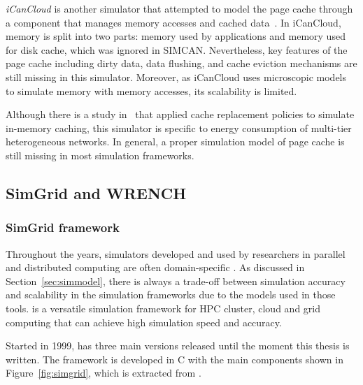 \textit{iCanCloud} is another simulator that attempted to model the page cache 
through a component that manages memory accesses and cached 
data~\cite{nunez2012icancloud}. 
In iCanCloud, memory is split into two parts: memory used by applications 
and memory used for disk cache, which was ignored in SIMCAN. 
Nevertheless, key features of the page cache including dirty data, 
data flushing, and cache eviction mechanisms are still missing 
in this simulator.
Moreover, as iCanCloud uses microscopic models to simulate memory 
with memory accesses, its scalability is limited. 

Although there is a study in~\cite{xu2018saving} that applied cache 
replacement policies to simulate in-memory caching, this simulator 
is specific to energy consumption of multi-tier heterogeneous networks.
In general, a proper simulation model of page cache is still missing 
in most simulation frameworks.

\subsection{SimGrid and WRENCH}

\subsubsection{SimGrid framework}

Throughout the years, simulators developed and used by researchers in 
parallel and distributed computing are often domain-specific 
\cite{casanova2014simgrid}.
As discussed in Section~\ref{sec:simmodel}, there is always a trade-off 
between simulation accuracy and scalability in the simulation frameworks due 
to the models used in those tools. 
\simgrid is a versatile simulation framework for HPC cluster, cloud and 
grid computing that can achieve high simulation speed and accuracy.

Started in 1999, \simgrid has three main versions released until the moment 
this thesis is written. 
The \simgrid framework is developed in C with the main components shown in 
Figure~\ref{fig:simgrid}, which is extracted from \cite{casanova2014simgrid}.

